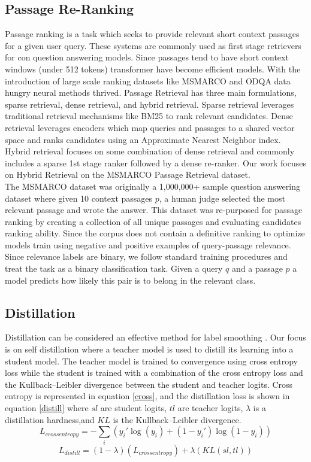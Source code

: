 \subsection{Passage Re-Ranking}
Passage ranking is a task which seeks to provide relevant short context passages for a given user query. These systems are commonly used as first stage retrievers for con question answering models. Since passages tend to have short context windows (under 512 tokens) transformer \cite{Vaswani2017AttentionIA} have become efficient models. With the introduction of large scale ranking datasets like MSMARCO \cite{Campos2016MSMA} and ODQA \cite{Karpukhin2020DensePR} data hungry neural methods thrived. Passage Retrieval has three main formulations, sparse retrieval,  dense retrieval, and hybrid retrieval. Sparse retrieval leverages traditional retrieval mechanisms like BM25 to rank relevant candidates. Dense retrieval leverages encoders which map queries and passages to a shared vector space and ranks candidates using an Approximate Nearest Neighbor index. Hybrid retrieval focuses on some combination of dense retrieval and commonly includes a sparse 1st stage ranker followed by a dense re-ranker. Our work focuses on Hybrid Retrieval on the MSMARCO Passage Retrieval dataset.\\
The MSMARCO dataset was originally a 1,000,000+ sample question answering dataset where given 10 context passages $p$, a human judge selected the most relevant passage and wrote the answer. This dataset was re-purposed for passage ranking by creating a collection of all unique passages and evaluating candidates ranking ability. Since the corpus does not contain a definitive ranking to optimize models train using negative and positive examples of query-passage relevance. Since relevance labels are binary, we follow standard training procedures and treat the task as a binary classification task. Given a query $q$ and a passage $p$ a model predicts how likely this pair is to belong in the relevant class. 
\subsection{Distillation}
Distillation can be considered an effective method for label smoothing \cite{Hinton2015DistillingTK}. Our focus is on self distillation where a teacher model is used to distill its learning into a student model. The teacher model is trained to convergence using cross entropy loss while the student is trained with a combination of the cross entropy loss and the Kullback–Leibler divergence between the student and teacher logits. Cross entropy is represented in equation \ref{cross}, and the distillation loss is shown in equation \ref{distill} where $sl$ are student logits, $tl$ are teacher logits, $\lambda$ is a distillation hardness,and $KL$ is the Kullback–Leibler divergence. 
\begin{equation}
L_{crossentropy} = - \sum_{i} ({y_i' \log(y_i) + (1-y_i') \log (1-y_i)})
\label{cross}
\end{equation}
\begin{equation}
L_{distill} = (1- \lambda )(L_{crossentropy}) + \lambda (KL(sl, tl))
\label{distill}
\end{equation}
